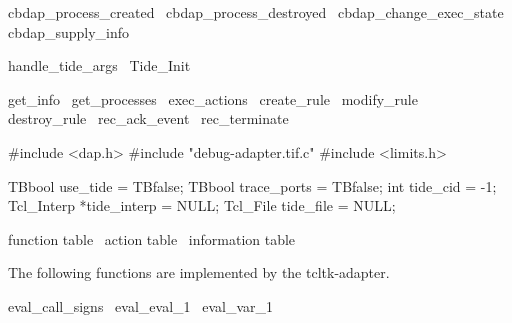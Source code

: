 \LA{}cbdap_process_created~{\nwtagstyle{}}\RA{}
\LA{}cbdap_process_destroyed~{\nwtagstyle{}}\RA{}
\LA{}cbdap_change_exec_state~{\nwtagstyle{}}\RA{}
\LA{}cbdap_supply_info~{\nwtagstyle{}}\RA{}

\LA{}handle_tide_args~{\nwtagstyle{}}\RA{}
\LA{}Tide_Init~{\nwtagstyle{}}\RA{}

\LA{}get_info~{\nwtagstyle{}}\RA{}
\LA{}get_processes~{\nwtagstyle{}}\RA{}
\LA{}exec_actions~{\nwtagstyle{}}\RA{}
\LA{}create_rule~{\nwtagstyle{}}\RA{}
\LA{}modify_rule~{\nwtagstyle{}}\RA{}
\LA{}destroy_rule~{\nwtagstyle{}}\RA{}
\LA{}rec_ack_event~{\nwtagstyle{}}\RA{}
\LA{}rec_terminate~{\nwtagstyle{}}\RA{}
\nwendcode{}\nwdocspar


\nwenddocs{}\endmoddef
#include <dap.h>
#include "debug-adapter.tif.c"
#include <limits.h>
\nwendcode{}\nwdocspar


\nwenddocs{}\endmoddef
TBbool use_tide = TBfalse;
TBbool trace_ports = TBfalse;
int tide_cid = -1;
Tcl_Interp *tide_interp = NULL;
Tcl_File tide_file = NULL;

\LA{}function table~{\nwtagstyle{}}\RA{}
\LA{}action table~{\nwtagstyle{}}\RA{}
\LA{}information table~{\nwtagstyle{}}\RA{}
\nwendcode{}\nwdocspar


The following functions are implemented by the tcltk-adapter.

\nwenddocs{}\endmoddef
\LA{}eval_call_signs~{\nwtagstyle{}}\RA{}
\LA{}eval_eval_1~{\nwtagstyle{}}\RA{}
\LA{}eval_var_1~{\nwtagstyle{}}\RA{}

